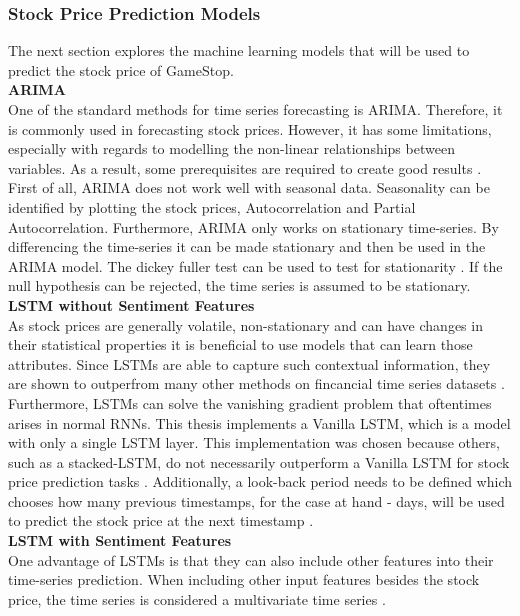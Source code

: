 \documentclass[11pt, a4paper]{article}
\begin{document}
\subsubsection{Stock Price Prediction Models}
The next section explores the machine learning models that will be used to predict the stock price of GameStop. \\

\noindent\textbf{ARIMA}\\
One of the standard methods for time series forecasting is ARIMA. Therefore, it is commonly used in forecasting stock prices.
However, it has some limitations, especially with regards to modelling the non-linear relationships between variables. As a result,
some prerequisites are required to create good results \citep{sima2018timeseries}.
First of all, ARIMA does not work well with seasonal data. Seasonality can be identified by plotting the stock prices, Autocorrelation and Partial Autocorrelation.
Furthermore, ARIMA only works on stationary time-series. 
By differencing the time-series it can be made stationary and then be used in the ARIMA model.
The dickey fuller test can be used to test for stationarity \citep{jain2017ASO}. If the null hypothesis can be rejected, the time series is assumed to be stationary. \\

\noindent\textbf{LSTM without Sentiment Features}\\
As stock prices are generally volatile, non-stationary and can have changes in their statistical properties it is beneficial to use
models that can learn those attributes. Since LSTMs are able to capture such contextual information, they are shown to outperfrom many other methods
on fincancial time series datasets \citep{preeti2019lstm}. Furthermore, LSTMs can solve the vanishing gradient problem that oftentimes arises in
normal RNNs. This thesis implements a Vanilla LSTM, which is a model with only a single LSTM layer. This implementation was chosen because others, such as a stacked-LSTM, do not necessarily outperform a Vanilla LSTM for stock price prediction tasks \citep{hai2020lstms}.
Additionally, a look-back period needs to be defined which chooses how many previous timestamps, for the case at hand - days, will be used to predict the 
stock price at the next timestamp \citep{lim2020lookback}.\\

\noindent\textbf{LSTM with Sentiment Features}\\
One advantage of LSTMs is that they can also include other features into their time-series prediction.
When including other input features besides the stock price, the time series is considered a multivariate time series \citep{liu2019multivariate}.
\end{document}
